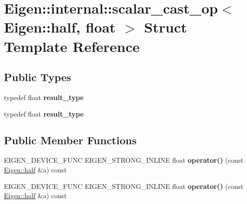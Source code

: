 \hypertarget{struct_eigen_1_1internal_1_1scalar__cast__op_3_01_eigen_1_1half_00_01float_01_4}{}\section{Eigen\+:\+:internal\+:\+:scalar\+\_\+cast\+\_\+op$<$ Eigen\+:\+:half, float $>$ Struct Template Reference}
\label{struct_eigen_1_1internal_1_1scalar__cast__op_3_01_eigen_1_1half_00_01float_01_4}
\subsection*{Public Types}
\begin{DoxyCompactItemize}
\item 
\mbox{\label{struct_eigen_1_1internal_1_1scalar__cast__op_3_01_eigen_1_1half_00_01float_01_4_a63cd7345a22603c82b463187da5dc8d8}} 
typedef float {\bfseries result\+\_\+type}
\item 
\mbox{\label{struct_eigen_1_1internal_1_1scalar__cast__op_3_01_eigen_1_1half_00_01float_01_4_a63cd7345a22603c82b463187da5dc8d8}} 
typedef float {\bfseries result\+\_\+type}
\end{DoxyCompactItemize}
\subsection*{Public Member Functions}
\begin{DoxyCompactItemize}
\item 
\mbox{\label{struct_eigen_1_1internal_1_1scalar__cast__op_3_01_eigen_1_1half_00_01float_01_4_a67ac502cc060a4e7c23053e194327c69}} 
E\+I\+G\+E\+N\+\_\+\+D\+E\+V\+I\+C\+E\+\_\+\+F\+U\+NC E\+I\+G\+E\+N\+\_\+\+S\+T\+R\+O\+N\+G\+\_\+\+I\+N\+L\+I\+NE float {\bfseries operator()} (const \hyperlink{struct_eigen_1_1half}{Eigen\+::half} \&a) const
\item 
\mbox{\label{struct_eigen_1_1internal_1_1scalar__cast__op_3_01_eigen_1_1half_00_01float_01_4_a67ac502cc060a4e7c23053e194327c69}} 
E\+I\+G\+E\+N\+\_\+\+D\+E\+V\+I\+C\+E\+\_\+\+F\+U\+NC E\+I\+G\+E\+N\+\_\+\+S\+T\+R\+O\+N\+G\+\_\+\+I\+N\+L\+I\+NE float {\bfseries operator()} (const \hyperlink{struct_eigen_1_1half}{Eigen\+::half} \&a) const
\end{DoxyCompactItemize}


